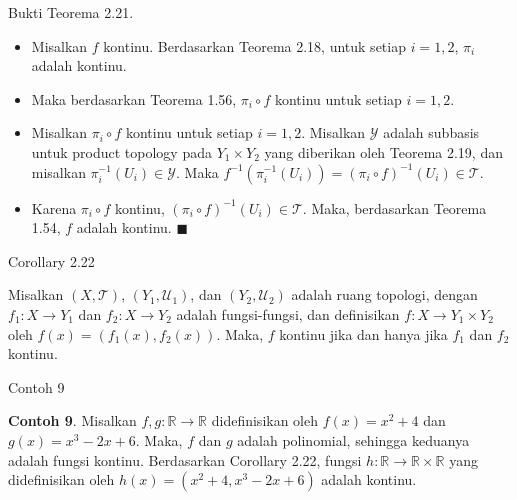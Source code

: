     \begin{frame}{Bukti Teorema 2.21.}
    \begin{tcolorbox}[title= Bukti Teorema 2.21]
    \begin{itemize}
        \item Misalkan $f$ kontinu. Berdasarkan Teorema 2.18, untuk setiap $i = 1, 2$, $\pi_i$ adalah kontinu. 
        \item Maka berdasarkan Teorema 1.56, $\pi_i \circ f$ kontinu untuk setiap $i = 1, 2$.
        \item Misalkan $\pi_i \circ f$ kontinu untuk setiap $i = 1, 2$. Misalkan $\mathcal{Y}$ adalah subbasis untuk product topology pada $Y_1 \times Y_2$ yang diberikan oleh Teorema 2.19, dan misalkan $\pi_i^{-1}(U_i) \in \mathcal{Y}$. Maka $f^{-1}(\pi_i^{-1}(U_i)) = (\pi_i \circ f)^{-1}(U_i) \in \mathcal{T}$. 
        \item Karena $\pi_i \circ f$ kontinu, $(\pi_i \circ f)^{-1}(U_i) \in \mathcal{T}$. Maka, berdasarkan Teorema 1.54, $f$ adalah kontinu. \(\blacksquare\)
    \end{itemize}
    
    \end{tcolorbox}
    \end{frame}
    
    
    \begin{frame}{Corollary 2.22}
    \begin{tcolorbox}[title=Corrolary 2.22]
         Misalkan $(X, \mathcal{T})$, $(Y_1, \mathcal{U}_1)$, dan $(Y_2, \mathcal{U}_2)$ adalah ruang topologi, dengan $f_1: X \rightarrow Y_1$ dan $f_2: X \rightarrow Y_2$ adalah fungsi-fungsi, dan definisikan $f: X \rightarrow Y_1 \times Y_2$ oleh $f(x) = (f_1(x), f_2(x)).$ Maka, $f$ kontinu jika dan hanya jika $f_1$ dan $f_2$ kontinu.
    
    
    \end{tcolorbox}
    \end{frame}
    
    \begin{frame}{Contoh 9}
    \begin{tcolorbox}[title=Contoh 9]
         \textbf{Contoh 9}. Misalkan $f, g: \mathbb{R} \rightarrow \mathbb{R}$ didefinisikan oleh $f(x) = x^2 + 4$ dan $g(x) = x^3 - 2x + 6$. Maka, $f$ dan $g$ adalah polinomial, sehingga keduanya adalah fungsi kontinu. Berdasarkan Corollary 2.22, fungsi $h: \mathbb{R} \rightarrow \mathbb{R} \times \mathbb{R}$ yang didefinisikan oleh $h(x) = (x^2 + 4, x^3 - 2x + 6)$ adalah kontinu.
    
    
    \end{tcolorbox}
    \end{frame}
